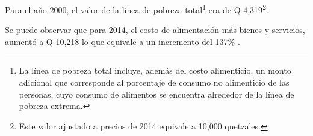  Para el año 2000, el valor de la línea de pobreza total\footnote{La línea de pobreza total incluye, además del costo alimenticio, un monto adicional que corresponde al porcentaje de consumo no alimenticio de las personas, cuyo consumo de alimentos se encuentra alrededor de la línea de pobreza extrema.} era de Q 4,319\footnote{ Este valor ajustado a precios de 2014  equivale a 10,000  quetzales. }.
 
  Se puede observar que para 2014, el costo de alimentación más bienes y servicios, aumentó a Q 10,218 lo que equivale a un incremento del 137\% .